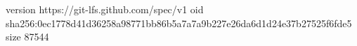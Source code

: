 version https://git-lfs.github.com/spec/v1
oid sha256:0ec1778d41d36258a98771bb86b5a7a7a9b227e26da6d1d24e37b27525f6fde5
size 87544
